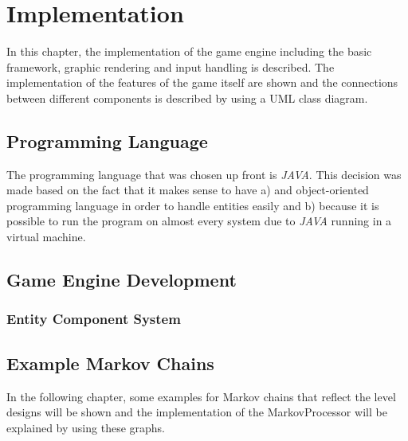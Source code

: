 \section{Implementation}\label{sec:implementation}
In this chapter, the implementation of the game engine including the basic framework, graphic rendering and input handling is described.
The implementation of the features of the game itself are shown and the connections between different components is described by using a
UML class diagram.
\subsection{Programming Language}\label{subsec:programming-language}
The programming language that was chosen up front is \textit{JAVA}.
This decision was made based on the fact that it makes sense to have a) and object-oriented programming language in order to
handle entities easily and b) because it is possible to run the program on almost every system due to \textit{JAVA} running
in a virtual machine.
\subsection{Game Engine Development}\label{subsec:game-engine-development}
\subsubsection{Entity Component System}
\subsection{Example Markov Chains}\label{subsec:example-markov-chains}
In the following chapter, some examples for Markov chains that reflect the level designs will be shown and the implementation of the
MarkovProcessor will be explained by using these graphs.

\begin{center}
\end{center}
